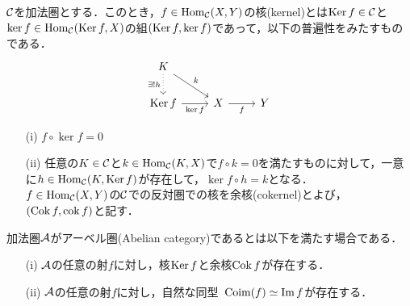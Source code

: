 \begin{defn}
	${\mathcal C}$を加法圏とする．このとき，$f\in\operatorname{\mathrm{Hom}}_{{\mathcal C}}(X,Y)$の核(kernel)とは$\operatorname{Ker} f\in{\mathcal C}$と$\ker f\in\operatorname{\mathrm{Hom}}_{{\mathcal C}}(\operatorname{Ker} f,X)$の組$(\operatorname{Ker} f,\ker f)$であって，以下の普遍性をみたすものである．
	\[\begin{tikzcd}
		K\ar[rd,"k"]\ar[d,"\exists !h",dotted,swap]\\
		\Ker f\ar[r,"\ker f",swap]&X\ar[r,"f",swap]&Y
\end{tikzcd}\]
\begin{itemize}
	\item[(i)]
		$f\circ\ker f=0$
	\item[(ii)]
		任意の$K\in{\mathcal C}$と$k\in\operatorname{\mathrm{Hom}}_{{\mathcal C}}(K,X)$で$f\circ k=0$を満たすものに対して，一意に$h\in\operatorname{\mathrm{Hom}}_{{\mathcal C}}(K,\operatorname{Ker} f)$が存在して，$\ker f\circ h=k$となる．\\
$f\in\operatorname{\mathrm{Hom}}_{{\mathcal C}}(X,Y)$の${\mathcal C}$での反対圏での核を余核(cokernel)とよび，$(\operatorname{Cok} f,\operatorname{cok} f)$と記す．
\end{itemize}
\end{defn}

\begin{defn}
	加法圏${\mathcal A}$がアーベル圏(Abelian category)であるとは以下を満たす場合である．
	\vspace{-3mm}
	\begin{itemize}
		\item[(i)]
			${\mathcal A}$の任意の射$f$に対し，核$\operatorname{Ker} f$と余核$\operatorname{Cok} f$が存在する．
		\item[(ii)]
			${\mathcal A}$の任意の射$f$に対し，自然な同型\ $\mathrm{Coim}(f)\simeq\Im f$が存在する．
	\end{itemize}
\end{defn}

